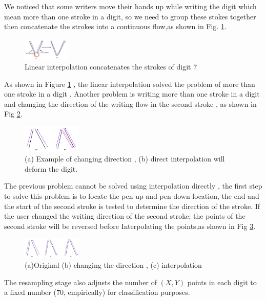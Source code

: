\documentclass[10pt]{IEEEtran}
\begin{document}
We noticed that some writers move their hands up while writing the digit which mean more than one stroke in a digit, so we need to group these stokes together then concatenate the strokes into a continuous flow,as shown in  Fig. \ref{fig:pre2}.


 \begin{figure}
 \centering
 \includegraphics[width=0.2\textwidth]{pre2}
\caption{Linear interpolation concatenates the strokes of digit 7 } \label{fig:pre2}
 \end{figure}

 As shown in Figure \ref{fig:pre2} , the linear interpolation solved the problem of more than one stroke in a digit . Another problem is writing more than one stroke in a digit and changing the direction of the writing flow in the second stroke , as shown in Fig \ref{fig:pre3}.
 \begin{figure}
 \centering
 \includegraphics[width=0.25\textwidth]{pre3}
 \caption{ (a)	Example of changing direction , (b) direct interpolation will deform the digit.}
  \label{fig:pre3}
  \end{figure}

The previous problem cannot be solved using interpolation directly , the first step to solve this problem is to locate the pen up and pen down location, the end and the start of the second stroke is tested to determine the direction of the stroke. If the user changed the writing direction of the second stroke; the points of the second stroke will be reversed before Interpolating the points,as shown in Fig \ref{fig:pre4}.

 \begin{figure}
 \centering
 \includegraphics[width=0.25\textwidth]{pre4}
 \caption{(a)Original (b) changing the direction , (c) interpolation }
\label{fig:pre4} \end{figure}
The resampling stage also adjusts the number of $(X,Y)$  points in each digit to a fixed number (70, empirically) for classification purposes.
\end{document}
